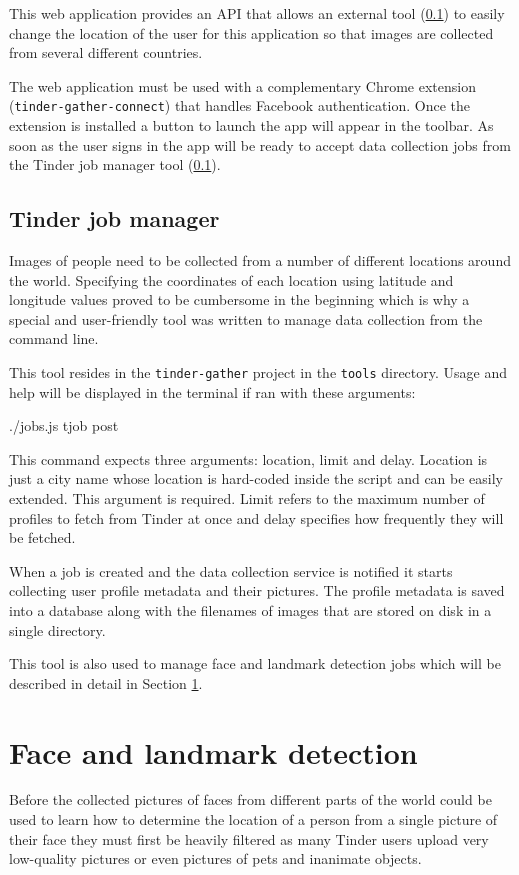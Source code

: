 This web application provides an API that allows an external tool 
(\ref{spec:data:jobs}) to easily change the location of the user for this 
application so that images are collected from several different 
countries.

The web application must be used with a complementary Chrome extension 
(\texttt{tinder-gather-connect}) that handles Facebook authentication.
Once the extension is installed a button to launch the app will appear in the 
toolbar. As soon as the user signs in the app will be ready to accept data 
collection jobs from the Tinder job manager tool (\ref{spec:data:jobs}).

\subsection{Tinder job manager}
\label{spec:data:jobs}
Images of people need to be collected from a number of different locations 
around the world. Specifying the coordinates of each location using latitude 
and longitude values proved to be cumbersome in the beginning which is why a 
special and user-friendly tool was written to manage data collection from the 
command line.

This tool resides in the \texttt{tinder-gather} project in the \texttt{tools} 
directory. Usage and help will be displayed in the terminal if ran with these 
arguments:
\begin{logs}
./jobs.js tjob post
\end{logs}

This command expects three arguments: location, limit and delay. Location is 
just a city name whose location is hard-coded inside the script and can be 
easily extended. This argument is required. Limit refers to the maximum number 
of profiles to fetch from Tinder at once and delay specifies how frequently 
they will be fetched.

When a job is created and the data collection service is notified it starts
collecting user profile metadata and their pictures. The profile metadata is
saved into a database along with the filenames of images that are stored on
disk in a single directory.

This tool is also used to manage face and landmark detection jobs which will 
be described in detail in Section \ref{spec:fd}. 

\section{Face and landmark detection}
\label{spec:fd}
Before the collected pictures of faces from different parts of the world 
could be used to learn how to determine the location of a person from a single 
picture of their face they must first be heavily filtered as many Tinder users 
upload very low-quality pictures or even pictures of pets and inanimate 
objects.

